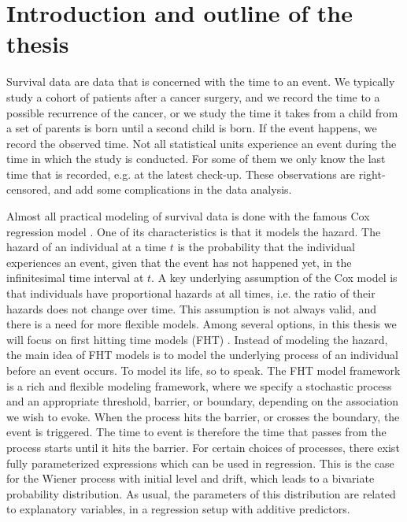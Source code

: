 \chapter{Introduction and outline of the thesis}
\label{sec:intro}
Survival data are data that is concerned with the time to an event.
We typically study a cohort of patients after a cancer surgery, and we record the time to a possible recurrence of the cancer, or we study the time it takes from a child from a set of parents is born until a second child is born.
If the event happens, we record the observed time.
Not all statistical units experience an event during the time in which the study is conducted.
For some of them we only know the last time that is recorded, e.g. at the latest check-up.
These observations are right-censored, and add some complications in the data analysis.

Almost all practical modeling of survival data is done with the famous Cox regression model \citep{cox-model}.
One of its characteristics is that it models the hazard.
The hazard of an individual at a time $t$ is the probability that the individual experiences an event, given that the event has not happened yet, in the infinitesimal time interval at $t$.
A key underlying assumption of the Cox model is that individuals have proportional hazards at all times, i.e. the ratio of their hazards does not change over time.
This assumption is not always valid, and there is a need for more flexible models.
Among several options, in this thesis we will focus on first hitting time models (FHT) \citep{leewhitmore2006}.
Instead of modeling the hazard, the main idea of FHT models is to model the underlying process of an individual before an event occurs.
To model its life, so to speak.
The FHT model framework is a rich and flexible modeling framework, where we specify a stochastic process and an appropriate threshold, barrier, or boundary, depending on the association we wish to evoke.
When the process hits the barrier, or crosses the boundary, the event is triggered.
The time to event is therefore the time that passes from the process starts until it hits the barrier.
For certain choices of processes, there exist fully parameterized expressions which can be used in regression.
This is the case for the Wiener process with initial level and drift, which leads to a bivariate probability distribution.
As usual, the parameters of this distribution are related to explanatory variables, in a regression setup with additive predictors.

